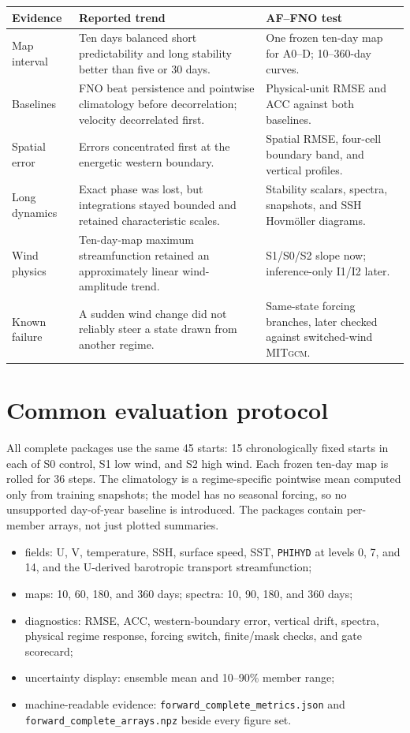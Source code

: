 \documentclass[11pt]{article}
\newcommand{\MITgcm}{\textsc{MITgcm}}
\begin{document}
\begin{tabularx}{\textwidth}{@{}p{}Yp{0.28\textwidth}@{}}
\toprule
\textbf{Evidence} & \textbf{Reported trend} & \textbf{AF--FNO test} \\
\midrule
Map interval & Ten days balanced short predictability and long stability better than five or 30 days. & One frozen ten-day map for A0--D; 10--360-day curves. \\
Baselines & FNO beat persistence and pointwise climatology before decorrelation; velocity decorrelated first. & Physical-unit RMSE and ACC against both baselines. \\
Spatial error & Errors concentrated first at the energetic western boundary. & Spatial RMSE, four-cell boundary band, and vertical profiles. \\
Long dynamics & Exact phase was lost, but integrations stayed bounded and retained characteristic scales. & Stability scalars, spectra, snapshots, and SSH Hovm\"oller diagrams. \\
Wind physics & Ten-day-map maximum streamfunction retained an approximately linear wind-amplitude trend. & S1/S0/S2 slope now; inference-only I1/I2 later. \\
Known failure & A sudden wind change did not reliably steer a state drawn from another regime. & Same-state forcing branches, later checked against switched-wind \MITgcm{}. \\
\bottomrule
\end{tabularx}

\section{Common evaluation protocol}

All complete packages use the same 45 starts: 15 chronologically fixed starts in each of
S0 control, S1 low wind, and S2 high wind.  Each frozen ten-day map is rolled for 36
steps.  The climatology is a regime-specific pointwise mean computed only from training
snapshots; the model has no seasonal forcing, so no unsupported day-of-year baseline is
introduced.  The packages contain per-member arrays, not just plotted summaries.

\begin{itemize}
\item fields: U, V, temperature, SSH, surface speed, SST, \texttt{PHIHYD} at levels
  0, 7, and 14, and the U-derived barotropic transport streamfunction;
\item maps: 10, 60, 180, and 360 days; spectra: 10, 90, 180, and 360 days;
\item diagnostics: RMSE, ACC, western-boundary error, vertical drift, spectra, physical
  regime response, forcing switch, finite/mask checks, and gate scorecard;
\item uncertainty display: ensemble mean and 10--90\% member range;
\item machine-readable evidence: \texttt{forward\_complete\_metrics.json} and
  \texttt{forward\_complete\_arrays.npz} beside every figure set.
\end{itemize}
\end{document}
